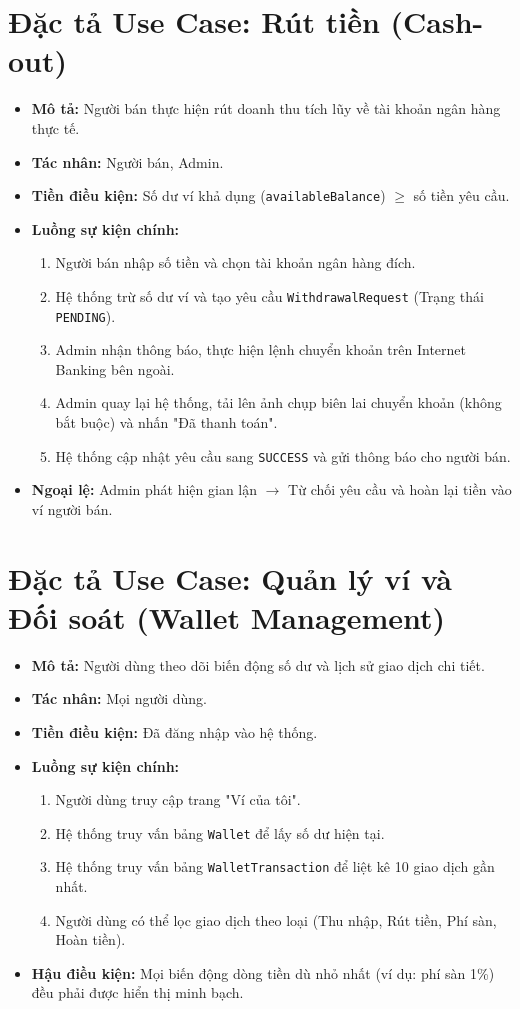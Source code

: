 \documentclass[../main.tex]{subfiles}
\begin{document}
\section{Đặc tả Use Case: Rút tiền (Cash-out)}
\begin{itemize}
    \item \textbf{Mô tả:} Người bán thực hiện rút doanh thu tích lũy về tài khoản ngân hàng thực tế.
    \item \textbf{Tác nhân:} Người bán, Admin.
    \item \textbf{Tiền điều kiện:} Số dư ví khả dụng (\texttt{availableBalance}) $\geq$ số tiền yêu cầu.
    \item \textbf{Luồng sự kiện chính:}
        \begin{enumerate}
            \item Người bán nhập số tiền và chọn tài khoản ngân hàng đích.
            \item Hệ thống trừ số dư ví và tạo yêu cầu \texttt{WithdrawalRequest} (Trạng thái \texttt{PENDING}).
            \item Admin nhận thông báo, thực hiện lệnh chuyển khoản trên Internet Banking bên ngoài.
            \item Admin quay lại hệ thống, tải lên ảnh chụp biên lai chuyển khoản (không bắt buộc) và nhấn "Đã thanh toán".
            \item Hệ thống cập nhật yêu cầu sang \texttt{SUCCESS} và gửi thông báo cho người bán.
        \end{enumerate}
    \item \textbf{Ngoại lệ:} Admin phát hiện gian lận $\rightarrow$ Từ chối yêu cầu và hoàn lại tiền vào ví người bán.
\end{itemize}

\section{Đặc tả Use Case: Quản lý ví và Đối soát (Wallet Management)}
\begin{itemize}
    \item \textbf{Mô tả:} Người dùng theo dõi biến động số dư và lịch sử giao dịch chi tiết.
    \item \textbf{Tác nhân:} Mọi người dùng.
    \item \textbf{Tiền điều kiện:} Đã đăng nhập vào hệ thống.
    \item \textbf{Luồng sự kiện chính:}
        \begin{enumerate}
            \item Người dùng truy cập trang "Ví của tôi".
            \item Hệ thống truy vấn bảng \texttt{Wallet} để lấy số dư hiện tại.
            \item Hệ thống truy vấn bảng \texttt{WalletTransaction} để liệt kê 10 giao dịch gần nhất.
            \item Người dùng có thể lọc giao dịch theo loại (Thu nhập, Rút tiền, Phí sàn, Hoàn tiền).
        \end{enumerate}
    \item \textbf{Hậu điều kiện:} Mọi biến động dòng tiền dù nhỏ nhất (ví dụ: phí sàn 1\%) đều phải được hiển thị minh bạch.
\end{itemize}
\end{document}
